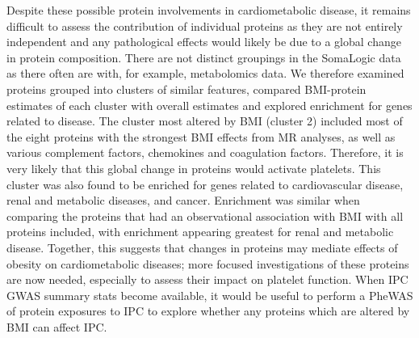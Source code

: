\documentclass[11pt,twoside]{bristolthesis}
\begin{document}
Despite these possible protein involvements in cardiometabolic disease, it remains difficult to assess the contribution of individual proteins as they are not entirely independent and any pathological effects would likely be due to a global change in protein composition. There are not distinct groupings in the SomaLogic data as there often are with, for example, metabolomics data. We therefore examined proteins grouped into clusters of similar features, compared BMI-protein estimates of each cluster with overall estimates and explored enrichment for genes related to disease. The cluster most altered by BMI (cluster 2) included most of the eight proteins with the strongest BMI effects from MR analyses, as well as various complement factors, chemokines and coagulation factors. Therefore, it is very likely that this global change in proteins would activate platelets. This cluster was also found to be enriched for genes related to cardiovascular disease, renal and metabolic diseases, and cancer. Enrichment was similar when comparing the proteins that had an observational association with BMI with all proteins included, with enrichment appearing greatest for renal and metabolic disease. Together, this suggests that changes in proteins may mediate effects of obesity on cardiometabolic diseases; more focused investigations of these proteins are now needed, especially to assess their impact on platelet function. When IPC GWAS summary stats become available, it would be useful to perform a PheWAS of protein exposures to IPC to explore whether any proteins which are altered by BMI can affect IPC.
\end{document}
